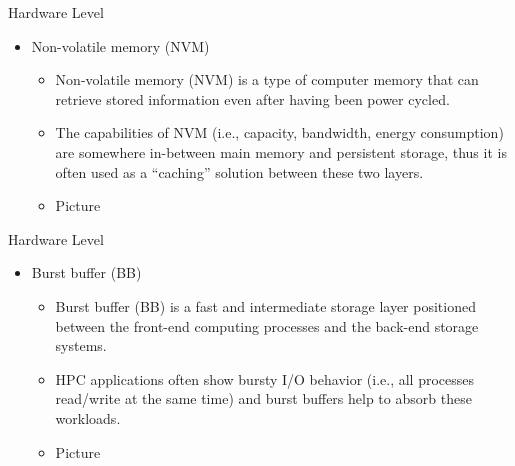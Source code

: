 \documentclass[compress,11pt,xcolor=svgnames,aspectratio=169]{beamer}
\begin{document}
\begin{frame}[t]{Hardware Level}

\begin{itemize}

    \item Non-volatile memory (NVM)\\[0.4cm]

    \begin{itemize}
    \setlength\itemsep{0.6cm}

        \item Non-volatile memory (NVM) is a type of computer memory that can retrieve stored information even after having been power cycled.

        \item The capabilities of NVM (i.e., capacity, bandwidth, energy consumption) are somewhere in-between main memory and persistent storage, thus it is often used as a ``caching'' solution between these two layers.

        \item Picture

    \end{itemize}

\end{itemize}

\end{frame}

\begin{frame}[t]{Hardware Level}

\begin{itemize}

    \item Burst buffer (BB)\\[0.4cm]

      \begin{itemize}
      \setlength\itemsep{0.6cm}

      \item Burst buffer (BB) is a fast and intermediate storage layer positioned between the front-end computing processes and the back-end storage systems.

      \item HPC applications often show bursty I/O behavior (i.e., all processes read/write at the same time) and burst buffers help to absorb these workloads.

      \item Picture

      \end{itemize}

\end{itemize}

\end{frame}
\end{document}
